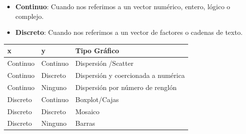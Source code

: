 \documentclass[
]{book}
\newenvironment{Shaded}{\begin{snugshade}}{\end{snugshade}}
\newcommand{\AttributeTok}[1]{\textcolor[rgb]{0.13,0.29,0.53}{#1}}
\newcommand{\CommentTok}[1]{\textcolor[rgb]{0.56,0.35,0.01}{\textit{#1}}}
\newcommand{\DecValTok}[1]{\textcolor[rgb]{0.00,0.00,0.81}{#1}}
\newcommand{\FunctionTok}[1]{\textcolor[rgb]{0.13,0.29,0.53}{\textbf{#1}}}
\newcommand{\NormalTok}[1]{#1}
\newcommand{\SpecialCharTok}[1]{\textcolor[rgb]{0.81,0.36,0.00}{\textbf{#1}}}
\begin{document}
\begin{itemize}
\item
  \textbf{Continuo}: Cuando nos referimos a un vector numérico, entero, lógico o complejo.
\item
  \textbf{Discreto}: Cuando nos referimos a un vector de factores o cadenas de texto.
\end{itemize}

\begin{longtable}[]{@{}lll@{}}
\toprule\noalign{}
x & y & Tipo Gráfico \\
\midrule\noalign{}
\endhead
\bottomrule\noalign{}
\endlastfoot
Continuo & Continuo & Dispersión /Scatter \\
Continuo & Discreto & Dispersión y coercionada a numérica \\
Continuo & Ninguno & Dispersión por número de renglón \\
Discreto & Continuo & Boxplot/Cajas \\
Discreto & Discreto & Mosaico \\
Discreto & Ninguno & Barras \\
\end{longtable}

\newpage

\begin{Shaded}
\end{Shaded}
\end{document}
